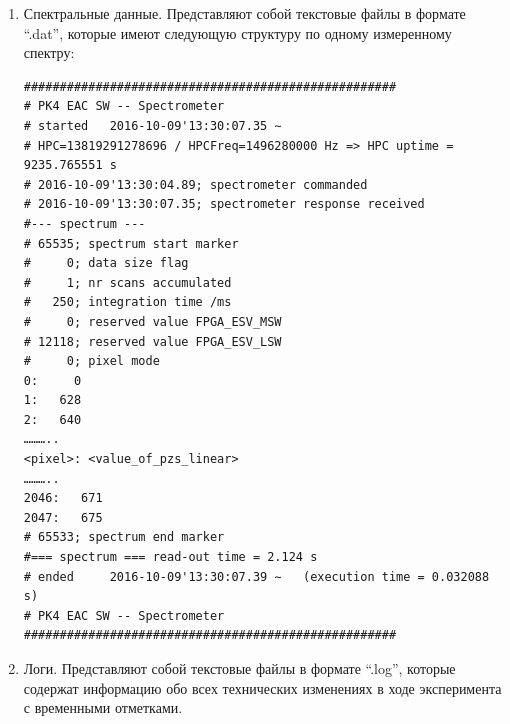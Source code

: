 \begin{enumerate}
    \item Спектральные данные. Представляют собой текстовые файлы в формате “.dat”, которые имеют следующую структуру по одному измеренному спектру:
    \begin{small}
        \begin{verbatim}
####################################################
# PK4 EAC SW -- Spectrometer
# started   2016-10-09'13:30:07.35 ∼
# HPC=13819291278696 / HPCFreq=1496280000 Hz => HPC uptime = 9235.765551 s
# 2016-10-09'13:30:04.89; spectrometer commanded
# 2016-10-09'13:30:07.35; spectrometer response received
#--- spectrum ---
# 65535; spectrum start marker
#     0; data size flag
#     1; nr scans accumulated
#   250; integration time /ms
#     0; reserved value FPGA_ESV_MSW
# 12118; reserved value FPGA_ESV_LSW
#     0; pixel mode
0:     0
1:   628
2:   640
………..
<pixel>: <value_of_pzs_linear>
………..
2046:   671
2047:   675
# 65533; spectrum end marker
#=== spectrum === read-out time = 2.124 s
# ended     2016-10-09'13:30:07.39 ∼   (execution time = 0.032088 s)
# PK4 EAC SW -- Spectrometer
####################################################
        \end{verbatim}
    \end{small}

    \item Логи. Представляют собой текстовые файлы в формате “.log”, которые содержат информацию обо всех
    технических изменениях в ходе эксперимента с временными отметками.


\end{enumerate}
